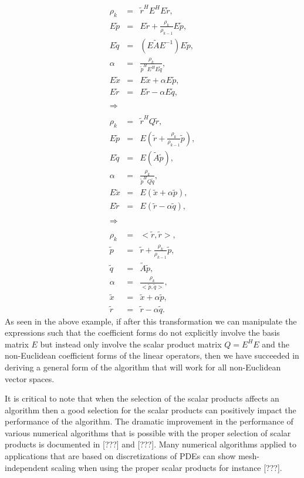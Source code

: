 \begin{eqnarray*}
\rho_k & = & \tilde{r}^H E^H E \tilde{r}, \\
E \tilde{p} & = & E \tilde{r} + \frac{\rho_k}{\rho_{k-1}} E \tilde{p}, \\
E \tilde{q} & = & ( E \tilde{A} E^{-1} ) E \tilde{p}, \\
\alpha & = & \frac{\rho_k}{\tilde{p}^H E^H E \tilde{q}}, \\
E \tilde{x} & = & E \tilde{x} + \alpha E \tilde{p}, \\
E \tilde{r} & = & E \tilde{r} - \alpha E \tilde{q}, \\
\\
\Rightarrow \\
\\
\rho_k & = & \tilde{r}^H Q \tilde{r}, \\
E \tilde{p} & = & E ( \tilde{r} + \frac{\rho_k}{\rho_{k-1}} \tilde{p} ), \\
E \tilde{q} & = & E ( \tilde{A} \tilde{p} ), \\
\alpha & = & \frac{\rho_k}{\tilde{p}^H Q \tilde{q}}, \\
E \tilde{x} & = & E ( \tilde{x} + \alpha \tilde{p}), \\
E \tilde{r} & = & E ( \tilde{r} - \alpha \tilde{q}), \\
\\
\Rightarrow \\
\\
\rho_k & = & <\tilde{r},\tilde{r}>, \\
\tilde{p} & = & \tilde{r} + \frac{\rho_k}{\rho_{k-1}} \tilde{p}, \\
\tilde{q} & = & \tilde{A} \tilde{p}, \\
\alpha & = & \frac{\rho_k}{<\tilde{p},\tilde{q}>}, \\
\tilde{x} & = & \tilde{x} + \alpha \tilde{p}, \\
\tilde{r} & = & \tilde{r} - \alpha \tilde{q}.
\end{eqnarray*}
%
As seen in the above example, if after this transformation we can manipulate
the expressions such that the coefficient forms do not explicitly involve the
basis matrix $E$ but instead only involve the scalar product matrix $Q = E^H
E$ and the non-Euclidean coefficient forms of the linear operators, then we
have succeeded in deriving a general form of the algorithm that will work for
all non-Euclidean vector spaces.

It is critical to note that when the selection of the scalar products affects
an algorithm then a good selection for the scalar products can positively
impact the performance of the algorithm.  The dramatic improvement in the
performance of various numerical algorithms that is possible with the proper
selection of scalar products is documented in [???] and [???].  Many numerical
algorithms applied to applications that are based on discretizations of PDEs
can show mesh-independent scaling when using the proper scalar products for
instance [???].

